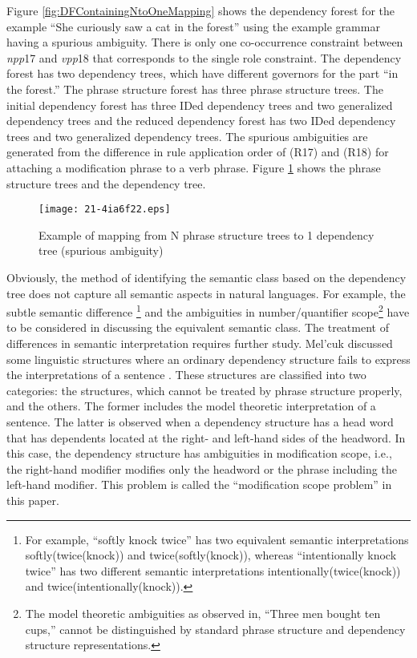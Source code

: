 \documentclass[english]{jnlp_1.4_rep}
\theoremstyle{break}
\theoremstyle{plain}
\theoremstyle{plain}
\begin{document}
Figure \ref{fig:DFContainingNtoOneMapping} shows the dependency forest
for the example ``She curiously saw a cat in the forest'' using the
example grammar having a spurious ambiguity. There is only one
co-occurrence constraint between \textit{npp}17 and \textit{vpp}18 that corresponds
to the single role constraint. The dependency forest has two
dependency trees, which have different governors for the part ``in the
forest.'' The phrase structure forest has three phrase structure
trees. The initial dependency forest has three IDed dependency trees
and two generalized dependency trees and the reduced dependency forest
has two IDed dependency trees and two generalized dependency
trees. The spurious ambiguities are generated from the difference in
rule application order of (R17) and (R18) for attaching a modification
phrase to a verb phrase. Figure \ref{fig:SuriousNtoOneMapping} shows the
phrase structure trees and the dependency tree.

\begin{figure}[b]
\begin{center}
\texttt{[image: 21-4ia6f22.eps]}
\end{center}
\caption{Example of mapping from N phrase structure trees to 1 dependency tree (spurious ambiguity)}
\label{fig:SuriousNtoOneMapping}
\end{figure}

Obviously, the method of identifying the semantic class based on the
dependency tree does not capture all semantic aspects in natural
languages. For example, the subtle semantic difference
\cite{Eisner96b}\footnote{For example, ``softly knock twice'' has two
  equivalent semantic interpretations softly(twice(knock)) and
  twice(softly(knock)), whereas ``intentionally knock twice'' has two
  different semantic interpretations intentionally(twice(knock)) and
  twice(intentionally(knock)).} and the ambiguities in
number/quantifier scope\footnote{The model theoretic ambiguities as
  observed in, ``Three men bought ten cups,'' cannot be distinguished by
  standard phrase structure and dependency structure representations.}
have to be considered in discussing the equivalent semantic class. The
treatment of differences in semantic interpretation requires further
study. Mel'cuk discussed some linguistic structures where an ordinary
dependency structure fails to express the interpretations of a
sentence \cite{Melcuk88}. These structures are classified into two
categories: the structures, which cannot be treated by phrase
structure properly, and the others. The former includes the model
theoretic interpretation of a sentence. The latter is observed when a
dependency structure has a head word that has dependents located at
the right- and left-hand sides of the headword. In this case, the
dependency structure has ambiguities in modification scope, i.e., the
right-hand modifier modifies only the headword or the phrase including
the left-hand modifier. This problem is called the ``modification scope
problem'' in this paper.
\end{document}
